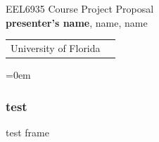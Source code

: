 \documentclass{beamer}
\begin{document}
{
\begin{frame}[plain,c]
\begin{center}
  {\color[RGB]{241,243,186}
{\huge EEL6935 Course Project Proposal}\\
  \vspace*{1.8in}
{\bf presenter's name}, name, name \\
    \vspace*{1em}
  \begin{tabular}{cc}
  University of Florida
   \end{tabular}
}
  \end{center}
\hoffset=0em
\end{frame}}

\begin{frame}
\frametitle{test}
test frame
\end{frame}
\end{document}
